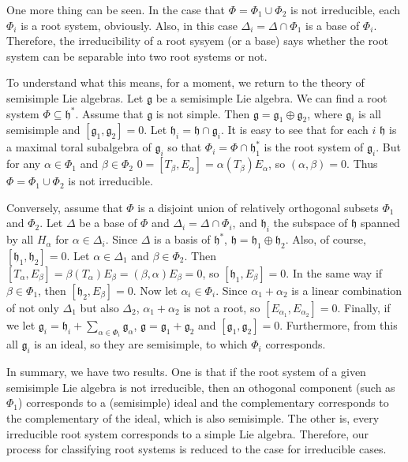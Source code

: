 \documentclass{article}
\newcommand{\lie}[1]{\mathfrak{#1}}
\begin{document}
One more thing can be seen.
In the case that $\Phi = \Phi_1 \cup \Phi_2$ is not irreducible, each $\Phi_i$ is a root system, obviously.
Also, in this case $\Delta_i = \Delta \cap \Phi_1$ is a base of $\Phi_i$.
Therefore, the irreducibility of a root sysyem (or a base) says whether the root system can be separable into two root systems or not.

To understand what this means, for a moment, we return to the theory of semisimple Lie algebras.
Let $\lie{g}$ be a semisimple Lie algebra.
We can find a root system $\Phi \subseteq \lie{h}^*$.
Assume that $\lie{g}$ is not simple.
Then $\lie{g} = \lie{g}_1 \oplus \lie{g}_2$, where $\lie{g}_i$ is all semisimple and $[\lie{g}_1, \lie{g}_2] = 0$.
Let $\lie{h}_i = \lie{h} \cap \lie{g}_i$.
It is easy to see that for each $i$ $\lie{h}$ is a maximal toral subalgebra of $\lie{g}_i$ so that $\Phi_i = \Phi \cap \lie{h}_1^*$ is the root system of $\lie{g}_i$.
But for any $\alpha \in \Phi_1$ and $\beta \in \Phi_2$ $0 = [T_\beta, E_\alpha] = \alpha(T_\beta) E_\alpha$, so $(\alpha, \beta) = 0$.
Thus $\Phi = \Phi_1 \cup \Phi_2$ is not irreducible.

Conversely, assume that $\Phi$ is a disjoint union of relatively orthogonal subsets $\Phi_1$ and $\Phi_2$.
Let $\Delta$ be a base of $\Phi$ and $\Delta_i = \Delta \cap \Phi_i$, and $\lie{h}_i$ the subspace of $\lie{h}$ spanned by all $H_\alpha$ for $\alpha \in \Delta_i$.
Since $\Delta$ is a basis of $\lie{h}^*$, $\lie{h} = \lie{h}_1 \oplus \lie{h}_2$.
Also, of course, $[\lie{h}_1, \lie{h}_2] = 0$.
Let $\alpha \in \Delta_1$ and $\beta \in \Phi_2$.
Then $[T_\alpha, E_\beta] = \beta(T_\alpha) E_\beta = (\beta, \alpha) E_\beta = 0$, so $[\lie{h}_1, E_\beta] = 0$.
In the same way if $\beta \in \Phi_1$, then $[\lie{h}_2, E_\beta] = 0$.
Now let $\alpha_i \in \Phi_i$.
Since $\alpha_1 + \alpha_2$ is a linear combination of not only $\Delta_1$ but also $\Delta_2$, $\alpha_1 + \alpha_2$ is not a root, so $[E_{\alpha_1}, E_{\alpha_2}] = 0$.
Finally, if we let $\lie{g}_i = \lie{h}_i + \sum_{\alpha \in \Phi_i} \lie{g}_\alpha$, $\lie{g} = \lie{g}_1 + \lie{g}_2$ and $[\lie{g}_1, \lie{g}_2] = 0$.
Furthermore, from this all $\lie{g}_i$ is an ideal, so they are semisimple, to which $\Phi_i$ corresponds.

In summary, we have two results.
One is that if the root system of a given semisimple Lie algebra is not irreducible, then an othogonal component (such as $\Phi_1$) corresponds to a (semisimple) ideal and the complementary corresponds to the complementary of the ideal, which is also semisimple.
The other is, every irreducible root system corresponds to a simple Lie algebra.
Therefore, our process for classifying root systems is reduced to the case for irreducible cases.
\end{document}
